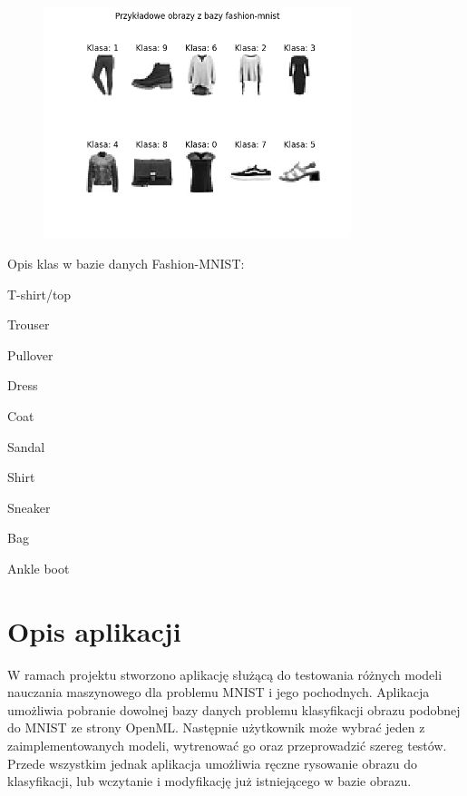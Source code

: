 \documentclass{article}
\begin{document}
\begin{figure}[H]
    \centering
    \includegraphics[width=0.8\textwidth]{img/baza_fashion_mnist.png}
\end{figure}

Opis klas w bazie danych Fashion-MNIST:

\begin{enumerate}
    \begin{multicols}{2}
        \centering
        \setcounter{enumi}{-1}
        \item T-shirt/top
        \item Trouser
        \item Pullover
        \item Dress
        \item Coat
        \item Sandal
        \item Shirt
        \item Sneaker
        \item Bag
        \item Ankle boot
    \end{multicols}
\end{enumerate}

\section{Opis aplikacji}
W ramach projektu stworzono aplikację służącą do testowania różnych modeli nauczania maszynowego dla
problemu MNIST i jego pochodnych. Aplikacja umożliwia pobranie
dowolnej bazy danych problemu klasyfikacji obrazu podobnej
do MNIST ze strony OpenML. Następnie użytkownik może wybrać
jeden z zaimplementowanych modeli, wytrenować go oraz przeprowadzić
szereg testów. Przede wszystkim jednak aplikacja umożliwia
ręczne rysowanie obrazu do klasyfikacji, lub wczytanie i
modyfikację już istniejącego w bazie obrazu.
\end{document}
